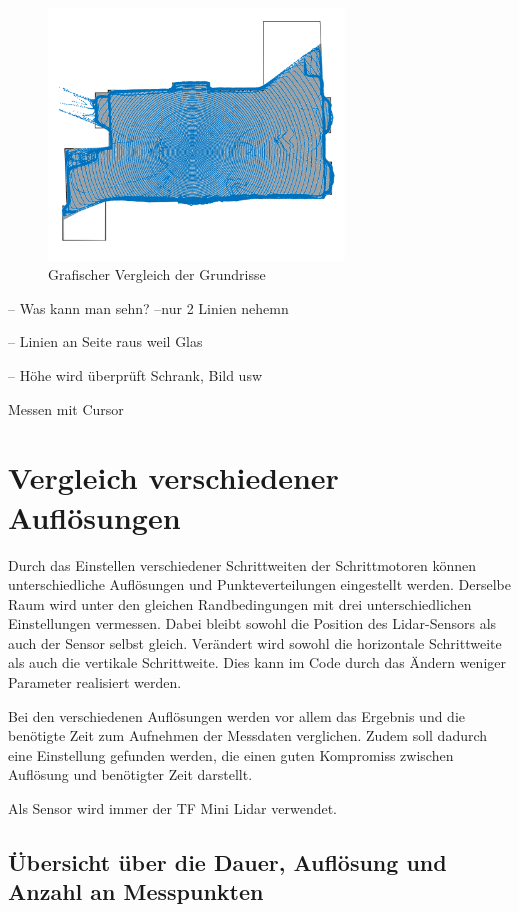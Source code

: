 \begin{figure}[H]
	\centering
	\includegraphics[width=0.7\textwidth]{images/Validierung/uebereinander}
	\caption{Grafischer Vergleich der Grundrisse}
	\label{uebereinander}
\end{figure}


-- Was kann man sehn?
--nur 2 Linien nehemn

-- Linien an Seite raus weil Glas

-- Höhe wird überprüft
Schrank, Bild usw

Messen mit Cursor



\section{Vergleich verschiedener Auflösungen}

Durch das Einstellen verschiedener Schrittweiten der Schrittmotoren können unterschiedliche Auflösungen und Punkteverteilungen eingestellt werden. Derselbe Raum wird unter den gleichen Randbedingungen mit drei unterschiedlichen Einstellungen vermessen. Dabei bleibt sowohl die Position des Lidar-Sensors als auch der Sensor selbst gleich. Verändert wird sowohl die horizontale Schrittweite als auch die vertikale Schrittweite. Dies kann im Code durch das Ändern weniger Parameter realisiert werden.

Bei den verschiedenen Auflösungen werden vor allem das Ergebnis und die benötigte Zeit zum Aufnehmen der Messdaten verglichen. Zudem soll dadurch eine Einstellung gefunden werden, die einen guten Kompromiss zwischen Auflösung und benötigter Zeit darstellt. 

Als Sensor wird immer der TF Mini Lidar verwendet.


\subsection{Übersicht über die Dauer, Auflösung und Anzahl an Messpunkten}

